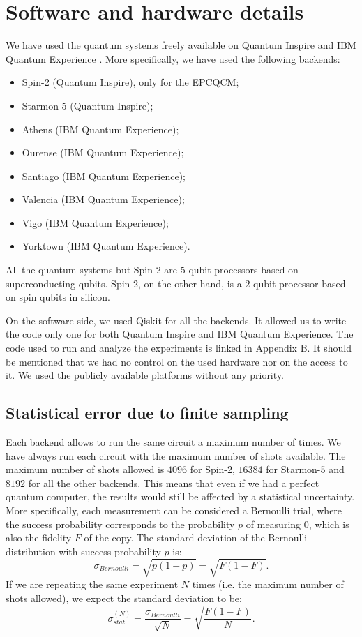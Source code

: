 \section{Software and hardware details}
We have used the quantum systems freely available on Quantum Inspire \cite{quantuminspire} and IBM Quantum Experience \cite{ibmquantumexperience}.
More specifically, we have used the following backends:
\begin{itemize}
    \item Spin-2 (Quantum Inspire), only for the EPCQCM;
    \item Starmon-5 (Quantum Inspire);
    \item Athens (IBM Quantum Experience);
    \item Ourense (IBM Quantum Experience);
    \item Santiago (IBM Quantum Experience);
    \item Valencia (IBM Quantum Experience);
    \item Vigo (IBM Quantum Experience);
    \item Yorktown (IBM Quantum Experience).
\end{itemize}
All the quantum systems but Spin-2 are $5$-qubit processors based on superconducting qubits.
Spin-2, on the other hand, is a $2$-qubit processor based on spin qubits in silicon.

On the software side, we used Qiskit \cite{Qiskit} for all the backends. 
It allowed us to write the code only one for both Quantum Inspire and IBM Quantum Experience.
The code used to run and analyze the experiments is linked in Appendix B.
It should be mentioned that we had no control on the used hardware nor on the access to it.
We used the publicly available platforms without any priority.

\subsection{Statistical error due to finite sampling}
Each backend allows to run the same circuit a maximum number of times. We have always run each circuit with the maximum number of shots available.
The maximum number of shots allowed is $4096$ for Spin-2, $16384$ for Starmon-5 and $8192$ for all the other backends.
This means that even if we had a perfect quantum computer, the results would still be affected by a statistical uncertainty.
More specifically, each measurement can be considered a Bernoulli trial, where the success probability corresponds to the probability $p$ of measuring $0$, which is also the fidelity $F$ of the copy.
The standard deviation of the Bernoulli distribution with success probability $p$ is:
\[
    \sigma_{Bernoulli}=\sqrt{p(1-p)}=\sqrt{F(1-F)}.
\]
If we are repeating the same experiment $N$ times (i.e. the maximum number of shots allowed), we expect the standard deviation to be:
\begin{equation}
    \sigma_{stat}^{(N)}=\frac{\sigma_{Bernoulli}}{\sqrt{N}}=\sqrt{\frac{F(1-F)}{N}}.
\end{equation}

